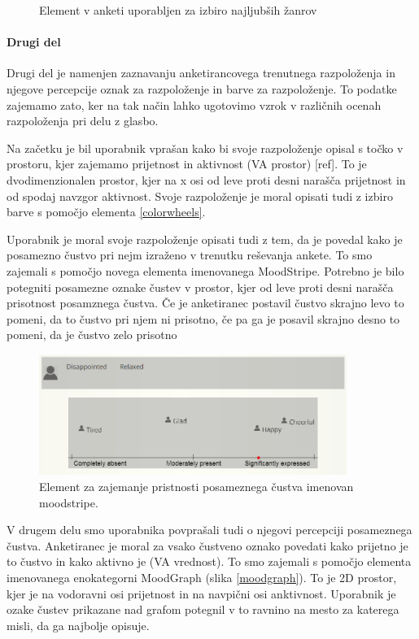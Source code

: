 \documentclass[a4paper, 12pt]{book}
\begin{document}
{\begin{figure}[h!t]
\caption{Element v anketi uporabljen za izbiro najljubših žanrov}
\label{genresel}
\end{figure}

\paragraph{Drugi del}

Drugi del je namenjen zaznavanju anketirancovega trenutnega razpoloženja in njegove percepcije oznak za razpoloženje in barve za razpoloženje. To podatke zajemamo zato, ker na tak način lahko ugotovimo vzrok v različnih ocenah razpoloženja pri delu z glasbo. 

Na začetku je bil uporabnik vprašan kako bi svoje razpoloženje opisal s točko v prostoru, kjer zajemamo prijetnost in aktivnost (VA prostor) [ref]. To je dvodimenzionalen prostor, kjer na x osi od leve proti desni narašča prijetnost in od spodaj navzgor aktivnost.    Svoje razpoloženje je moral opisati tudi z izbiro barve s pomočjo elementa \ref{colorwheels}. 

Uporabnik je moral svoje razpoloženje opisati tudi z tem, da je povedal kako je posamezno čustvo pri nejm izraženo v trenutku reševanja ankete. To smo zajemali s pomočjo novega elementa imenovanega MoodStripe. Potrebno je bilo potegniti posamezne oznake čustev v prostor, kjer od leve proti desni narašča prisotnost posamznega čustva. Če je anketiranec postavil čustvo skrajno levo to pomeni, da to čustvo pri njem ni prisotno, če pa ga je posavil skrajno desno to pomeni, da je čustvo zelo prisotno 

\begin{figure}[ht]
\centering
\includegraphics[width=10cm]{moodstripe.png}

\caption{Element za zajemanje pristnosti posameznega čustva imenovan moodstripe.}
\label{genresel}
\end{figure}

V drugem delu smo uporabnika povprašali tudi o njegovi percepciji posameznega čustva. Anketiranec je moral za vsako čustveno oznako povedati kako prijetno je to čustvo in kako aktivno je (VA vrednost). To smo zajemali s pomočjo elementa imenovanega enokategorni MoodGraph (slika \ref{moodgraph}). To je 2D prostor, kjer je na vodoravni osi prijetnost in na navpični osi anktivnost. Uporabnik je ozake čustev prikazane nad grafom potegnil v to ravnino na mesto za katerega misli, da ga najbolje opisuje. 

}
\end{document}
